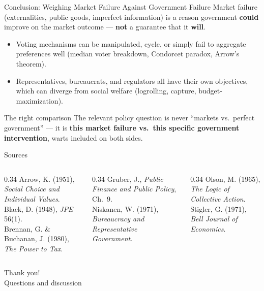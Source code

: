 \documentclass[11pt,aspectratio=169]{beamer}
\begin{document}
\begin{frame}{Conclusion: Weighing Market Failure Against Government Failure}
  Market failure (externalities, public goods, imperfect information) is a reason government \textbf{could} improve on the market outcome --- \textbf{not} a guarantee that it \textbf{will}.
  \begin{itemize}
    \item Voting mechanisms can be manipulated, cycle, or simply fail to aggregate preferences well (median voter breakdown, Condorcet paradox, Arrow's theorem).
    \item Representatives, bureaucrats, and regulators all have their own objectives, which can diverge from social welfare (logrolling, capture, budget-maximization).
  \end{itemize}
  \begin{alertblock}{The right comparison}
    The relevant policy question is never ``markets vs.\ perfect government'' --- it is \textbf{this market failure vs.\ this specific government intervention}, warts included on both sides.
  \end{alertblock}
\end{frame}

\begin{frame}{Sources}
  \tiny
  \begin{columns}[T]
    \begin{column}{0.34\textwidth}
      Arrow, K. (1951), \emph{Social Choice and Individual Values}.\\
      Black, D. (1948), \emph{JPE} 56(1).\\
      Brennan, G. \& Buchanan, J. (1980), \emph{The Power to Tax}.
    \end{column}
    \begin{column}{0.34\textwidth}
      Gruber, J., \emph{Public Finance and Public Policy}, Ch.\ 9.\\
      Niskanen, W. (1971), \emph{Bureaucracy and Representative Government}.
    \end{column}
    \begin{column}{0.34\textwidth}
      Olson, M. (1965), \emph{The Logic of Collective Action}.\\
      Stigler, G. (1971), \emph{Bell Journal of Economics}.
    \end{column}
  \end{columns}
\end{frame}

\begin{frame}[standout]
  Thank you!\\
  \vspace{0.5em}
  \small Questions and discussion
\end{frame}
\end{document}
